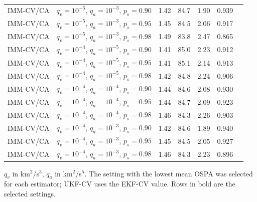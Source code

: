 \begin{table}[!htbp]
\begin{tabular}{@{}llrrrrl@{}}
IMM-CV/CA & $q_v = 10^{-5}$, $q_a = 10^{-3}$, $p_s = 0.90$ & 1.42 & 84.7 & 1.90 & 0.939 &  \\
IMM-CV/CA & $q_v = 10^{-5}$, $q_a = 10^{-3}$, $p_s = 0.95$ & 1.45 & 84.5 & 2.06 & 0.917 &  \\
IMM-CV/CA & $q_v = 10^{-5}$, $q_a = 10^{-3}$, $p_s = 0.98$ & 1.49 & 83.8 & 2.47 & 0.865 &  \\
IMM-CV/CA & $q_v = 10^{-4}$, $q_a = 10^{-5}$, $p_s = 0.90$ & 1.41 & 85.0 & 2.23 & 0.912 &  \\
IMM-CV/CA & $q_v = 10^{-4}$, $q_a = 10^{-5}$, $p_s = 0.95$ & 1.41 & 85.1 & 2.14 & 0.913 &  \\
IMM-CV/CA & $q_v = 10^{-4}$, $q_a = 10^{-5}$, $p_s = 0.98$ & 1.42 & 84.8 & 2.24 & 0.906 &  \\
IMM-CV/CA & $q_v = 10^{-4}$, $q_a = 10^{-4}$, $p_s = 0.90$ & 1.44 & 84.6 & 2.08 & 0.930 &  \\
IMM-CV/CA & $q_v = 10^{-4}$, $q_a = 10^{-4}$, $p_s = 0.95$ & 1.44 & 84.7 & 2.09 & 0.923 &  \\
IMM-CV/CA & $q_v = 10^{-4}$, $q_a = 10^{-4}$, $p_s = 0.98$ & 1.46 & 84.3 & 2.26 & 0.903 &  \\
IMM-CV/CA & $q_v = 10^{-4}$, $q_a = 10^{-3}$, $p_s = 0.90$ & 1.42 & 84.6 & 1.89 & 0.940 &  \\
IMM-CV/CA & $q_v = 10^{-4}$, $q_a = 10^{-3}$, $p_s = 0.95$ & 1.45 & 84.5 & 2.05 & 0.927 &  \\
IMM-CV/CA & $q_v = 10^{-4}$, $q_a = 10^{-3}$, $p_s = 0.98$ & 1.46 & 84.3 & 2.23 & 0.896 &  \\
\bottomrule
\end{tabular}

\smallskip
\parbox{\textwidth}{\footnotesize $q_v$ in km$^2$/s$^3$, $q_a$ in km$^2$/s$^5$. The setting with the lowest mean OSPA was selected for each estimator; UKF-CV uses the EKF-CV value. Rows in bold are the selected settings.}
\end{table}
